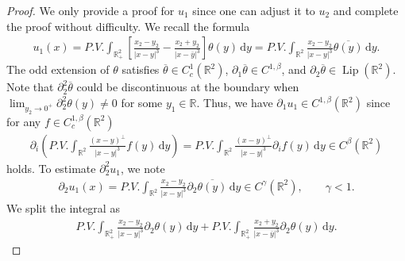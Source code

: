 \documentclass[10pt]{amsart}
\theoremstyle{definition}
\theoremstyle{remark}
\numberwithin{equation}{section}
\newcommand{\ud}{\mathrm{d}}
\newcommand{\0}{\emptyset}
\newcommand{\bt}{\beta}
\newcommand{\tht}{\theta}
\newcommand{\bbR}{\mathbb R}
\begin{document}
	\begin{proof} We only provide a proof for $u_1$ since one can adjust it to $u_2$ and complete the proof without difficulty. We recall the formula \begin{equation*}
			\begin{split}
				u_{1} (x) = P.V. \int_{\bbR_+^2} \left[ \frac{x_2-y_2}{|x-y|^3} -  \frac{x_2 + y_2 }{|x-\overline{y}|^3} \right] \tht(y) \,\ud y = P.V. \int_{\bbR^2} \frac{x_2-y_2}{|x-y|^3} \overline{\tht(y)} \,\ud y.
			\end{split}
		\end{equation*} The odd extension of $\tht$ satisfies $\overline{\tht} \in C^1_c(\mathbb{R}^2)$, $\partial_1 \overline{\tht} \in C^{1,\beta}$, and $\partial_2 \overline{\tht} \in \operatorname{Lip}(\mathbb{R}^2)$. Note that $\partial_2^2 \overline{\tht}$ could be discontinuous at the boundary when $\lim_{y_2 \to 0^+} \partial_2^2\theta(y) \neq 0$ for some $y_1 \in \bbR$. Thus, we have $\partial_1 u_1 \in C^{1,\beta}(\mathbb{R}^2)$ since for any $f \in C^{1,\bt}_c(\mathbb{R}^2)$ \begin{equation*}
			\begin{split}
				\partial_i \left( P.V. \int_{\bbR^2} \frac{(x-y)^{\perp}}{|x-y|^3} f(y) \,\ud y \right) = P.V. \int_{\bbR^2} \frac{(x-y)^{\perp}}{|x-y|^3} \partial_i f(y) \,\ud y \in C^{\bt}(\mathbb{R}^2)
			\end{split}
		\end{equation*} holds. To estimate $\partial_2^2 u_1$, we note \begin{equation*}
			\begin{split}
				\partial_2 u_1(x) = P.V. \int_{\bbR^2} \frac{x_2-y_2}{|x-y|^3} \partial_2 \overline{\tht(y)} \,\ud y \in C^{\gamma}(\mathbb{R}^2), \qquad \gamma < 1.
			\end{split}
		\end{equation*} We split the integral as \begin{equation*}
			\begin{gathered}
				P.V. \int_{\bbR^2_{+}} \frac{x_2-y_2}{|x-y|^3} \partial_2 \tht(y) \,\ud y + P.V. \int_{\bbR^2_{+}} \frac{x_2+y_2}{|x-\overline{y}|^3} \partial_2 \tht(y) \,\ud y .
			\end{gathered}

\end{equation*}
\end{proof}
\end{document}
